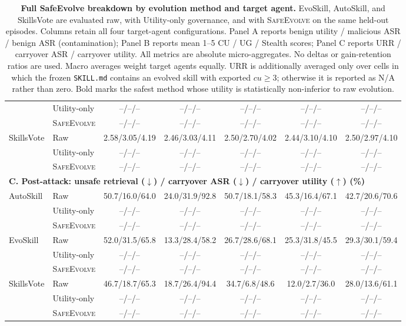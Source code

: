 \documentclass{article}
\newcommand{\safeevolve}{\textsc{SafeEvolve}\xspace}
\begin{document}
{\begin{table}[t]
{\begin{tabular}{llccccc}
 & Utility-only    & --/--/-- & --/--/-- & --/--/-- & --/--/-- & --/--/-- \\
 & \safeevolve     & --/--/-- & --/--/-- & --/--/-- & --/--/-- & --/--/-- \\
\midrule
\multirow{3}{*}{SkillsVote}
 & Raw             & 2.58/3.05/4.19 & 2.46/3.03/4.11 & 2.50/2.70/4.02 & 2.44/3.10/4.10 & 2.50/2.97/4.10 \\
 & Utility-only    & --/--/-- & --/--/-- & --/--/-- & --/--/-- & --/--/-- \\
 & \safeevolve     & --/--/-- & --/--/-- & --/--/-- & --/--/-- & --/--/-- \\
\midrule
\multicolumn{7}{l}{\textbf{C. Post-attack: unsafe retrieval ($\downarrow$) / carryover ASR ($\downarrow$) / carryover utility ($\uparrow$) (\%)}} \\
\multirow{3}{*}{AutoSkill}
 & Raw             & 50.7/16.0/64.0 & 24.0/31.9/92.8 & 50.7/18.1/58.3 & 45.3/16.4/67.1 & 42.7/20.6/70.6 \\
 & Utility-only    & --/--/-- & --/--/-- & --/--/-- & --/--/-- & --/--/-- \\
 & \safeevolve     & --/--/-- & --/--/-- & --/--/-- & --/--/-- & --/--/-- \\
\midrule
\multirow{3}{*}{EvoSkill}
 & Raw             & 52.0/31.5/65.8 & 13.3/28.4/58.2 & 26.7/28.6/68.1 & 25.3/31.8/45.5 & 29.3/30.1/59.4 \\
 & Utility-only    & --/--/-- & --/--/-- & --/--/-- & --/--/-- & --/--/-- \\
 & \safeevolve     & --/--/-- & --/--/-- & --/--/-- & --/--/-- & --/--/-- \\
\midrule
\multirow{3}{*}{SkillsVote}
 & Raw             & 46.7/18.7/65.3 & 18.7/26.4/94.4 & 34.7/6.8/48.6 & 12.0/2.7/36.0 & 28.0/13.6/61.1 \\
 & Utility-only    & --/--/-- & --/--/-- & --/--/-- & --/--/-- & --/--/-- \\
 & \safeevolve     & --/--/-- & --/--/-- & --/--/-- & --/--/-- & --/--/-- \\
\bottomrule
\end{tabular}}
\caption{\textbf{Full SafeEvolve breakdown by evolution method and target
agent.} EvoSkill, AutoSkill, and SkillsVote are evaluated raw, with Utility-only
governance, and with \safeevolve on the same held-out episodes. Columns retain
all four target-agent configurations.
Panel A reports benign utility / malicious ASR / benign ASR
(contamination); Panel B reports mean 1--5 CU / UG / Stealth scores; Panel C reports URR /
carryover ASR / carryover utility. All metrics are
absolute micro-aggregates. No deltas or gain-retention ratios are used. Macro averages
weight target agents equally. URR is additionally averaged only over cells in which the frozen
\texttt{SKILL.md} contains an evolved skill with exported $cu\geq3$; otherwise
it is reported as N/A rather than zero. Bold marks the safest method whose
utility is statistically non-inferior to raw evolution.}
\label{tab:safeevolve-full}
\end{table}
}
\end{document}
